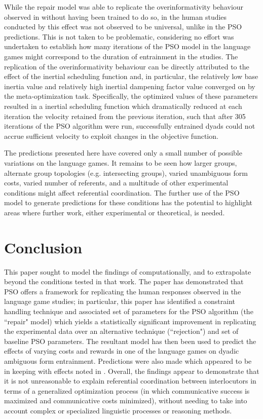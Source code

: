 \documentclass[12pt,a4paper]{article}
\begin{document}
While the repair model was able to replicate the overinformativity behaviour observed in \citeauthor{brennan1996} without having been trained to do so, in the human studies conducted by \citeauthor{brennan1996} this effect was not observed to be universal, unlike in the PSO predictions. This is not taken to be problematic, considering no effort was undertaken to establish how many iterations of the PSO model in the \citeauthor{rohde2012} language games might correspond to the duration of entrainment in the \citeauthor{brennan1996} studies. The replication of the overinformativity behaviour can be directly attributed to the effect of the inertial scheduling function and, in particular, the relatively low base inertia value and relatively high inertial dampening factor value converged on by the meta-optimization task.  Specifically, the optimized values of these parameters resulted in a inertial scheduling function which dramatically reduced at each iteration the velocity retained from the previous iteration, such that after 305 iterations of the PSO algorithm were run, successfully entrained dyads could not accrue sufficient velocity to exploit changes in the objective function.

The predictions presented here have covered only a small number of possible variations on the \citeauthor{rohde2012} language games. It remains to be seen how larger groups, alternate group topologies (e.g. intersecting groups), varied unambiguous form costs, varied number of referents, and a multitude of other experimental conditions might affect referential coordination. The further use of the PSO model to generate predictions for these conditions has the potential to highlight areas where further work, either experimental or theoretical, is needed.



\section{Conclusion}
This paper sought to model the findings of \citeauthor{rohde2012} computationally, and to extrapolate beyond the conditions tested in that work. The paper has demonstrated that PSO offers a framework for replicating the human responses observed in the \citeauthor{rohde2012} language game studies; in particular, this paper has identified a constraint handling technique and associated set of parameters for the PSO algorithm (the ``repair" model) which yields a statistically significant improvement in replicating the experimental data over an alternative technique (``rejection") and set of baseline PSO parameters. The resultant model has then been used to predict the effects of varying costs and rewards in one of the \citeauthor{rohde2012} language games on dyadic ambiguous form entrainment. Predictions were also made which appeared to be in keeping with effects noted in \citeauthor{brennan1996}. Overall, the findings appear to demonstrate that it is not unreasonable to explain referential coordination between interlocutors in terms of a generalized optimization process (in which communicative success is maximized and communicative costs minimized), without needing to take into account complex or specialized linguistic processes or reasoning methods.

\pagebreak


\end{document}
